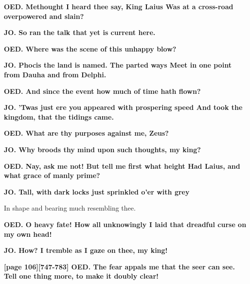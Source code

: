 \documentclass[11pt,letter]{book}
\begin{document}
\par \textbf{OED. Methought I heard thee say, King Laius Was at a cross-road overpowered and slain?}
\par 

\par \textbf{JO. So ran the talk that yet is current here.}
\par 

\par \textbf{OED. Where was the scene of this unhappy blow?}
\par 

\par \textbf{JO. Phocis the land is named. The parted ways Meet in one point from Dauha and from Delphi.}
\par 

\par \textbf{OED. And since the event how much of time hath flown?}
\par 

\par \textbf{JO. ’Twas just ere you appeared with prospering speed And took the kingdom, that the tidings came.}
\par 

\par \textbf{OED. What are thy purposes against me, Zeus?}
\par 

\par \textbf{JO. Why broods thy mind upon such thoughts, my king?}
\par 

\par \textbf{OED. Nay, ask me not! But tell me first what height Had Laius, and what grace of manly prime?}
\par 

\par \textbf{JO. Tall, with dark locks just sprinkled o’er with grey}
\par   In shape and bearing much resembling thee.

\par \textbf{OED. O heavy fate! How all unknowingly I laid that dreadful curse on my own head!}
\par 

\par \textbf{JO. How? I tremble as I gaze on thee, my king!}
\par 

\par \textbf{[page 106][747-783] OED. The fear appals me that the seer can see. Tell one thing more, to make it doubly clear!}
\par 
\end{document}

